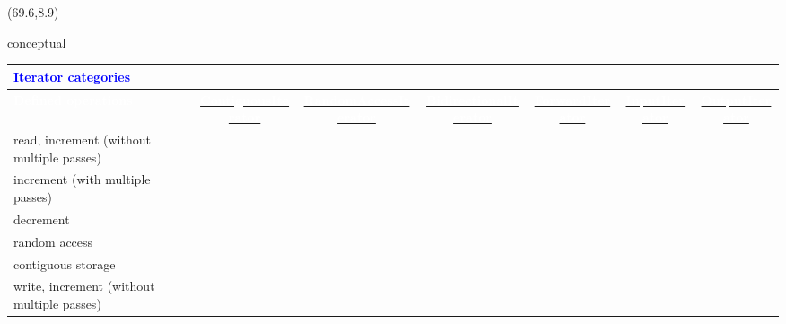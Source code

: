 \documentclass{beamer}
\newcommand\mywt[1]{\textcolor{white}{#1}}
\newcommand\ctblt[1]{\textcolor{blue}{\textbf{\Large{#1}}}}
\begin{document}
\newcommand\yescell{\cellcolor{yes}\checkmark}
\newcommand\yesdcell{\cellcolor{yesd}\checkmark}
\newcommand\nocell{\cellcolor{no}}
\newcommand\nodcell{\cellcolor{nod}}

\begin{textblock}{57.4}(69.6,8.9)
  \begin{beamercolorbox}[sep=2mm,wd=48.4cm,rounded=true]{conceptual}
    \begin{tabular*}{47.8cm}{l|c|c|c|c|c|c}
      \multicolumn{6}{l}{\ctblt{Iterator categories}} \\ \hline
      \rowcolor{DodgerBlue}
      \mywt{\bfseries{Defined operations}} & \href{http://en.cppreference.com/w/cpp/concept/ContiguousIterator}{\mywt{\bfseries{ContiguousIterator}}} & \href{http://en.cppreference.com/w/cpp/concept/RandomAccessIterator}{\mywt{\bfseries{RandomAccessIterator}}} & \href{http://en.cppreference.com/w/cpp/concept/BidirectionalIterator}{\mywt{\bfseries{BidirectionalIterator}}} & \href{http://en.cppreference.com/w/cpp/concept/ForwardIterator}{\mywt{\bfseries{ForwardIterator}}} & \href{http://en.cppreference.com/w/cpp/concept/InputIterator}{\mywt{\bfseries{InputIterator}}} & \href{http://en.cppreference.com/w/cpp/concept/OutputIterator}{\mywt{\bfseries{OutputIterator}}} \\ \hline
      read, increment (without multiple passes)  & \yesdcell  & \yesdcell  & \yesdcell  & \yesdcell  & \yesdcell   & \nodcell \\
      \rowcolor{coddrow}
      increment (with multiple passes)           & \yescell & \yescell & \yescell & \yescell & \nocell   & \nocell \\
      decrement                                  & \yesdcell  & \yesdcell  & \yesdcell  & \nodcell   & \nodcell    & \nodcell \\
      \rowcolor{coddrow}
      random access                              & \yescell & \yescell & \nocell  & \nocell  & \nocell   & \nocell \\
      contiguous storage                         & \yesdcell  & \nodcell   & \nodcell   & \nodcell   & \nodcell    & \nodcell \\
      \rowcolor{coddrow}
      write, increment (without multiple passes) & \nocell  & \nocell  & \nocell  & \nocell  & \nocell   & \yescell \\
    \end{tabular*}
  \end{beamercolorbox}
\end{textblock}
\end{document}
